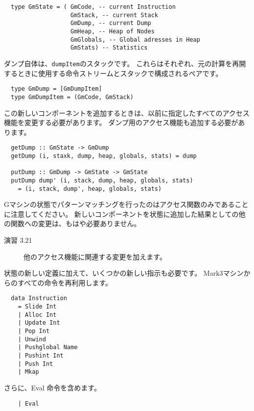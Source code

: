 \documentclass{jarticle}
\begin{document}
\begin{verbatim}
  type GmState = ( GmCode, -- current Instruction
                   GmStack, -- current Stack
                   GmDump, -- current Dump
                   GmHeap, -- Heap of Nodes
                   GmGlobals, -- Global adresses in Heap
                   GmStats) -- Statistics
\end{verbatim}

ダンプ自体は、\texttt{dumpItem}のスタックです。
これらはそれぞれ、元の計算を再開するときに使用する命令ストリームとスタックで構成されるペアです。

\begin{verbatim}
  type GmDump = [GmDumpItem]
  type GmDumpItem = (GmCode, GmStack)
\end{verbatim}

この新しいコンポーネントを追加するときは、以前に指定したすべてのアクセス機能を変更する必要があります。
ダンプ用のアクセス機能も追加する必要があります。

\begin{verbatim}
  getDump :: GmState -> GmDump
  getDump (i, staxk, dump, heap, globals, stats) = dump

  putDump :: GmDump -> GmState -> GmState
  putDump dump' (i, stack, dump, heap, globals, stats)
    = (i, stack, dump', heap, globals, stats)
\end{verbatim}

Gマシンの状態でパターンマッチングを行ったのはアクセス関数のみであることに注意してください。
新しいコンポーネントを状態に追加した結果としての他の関数への変更は、もはや必要ありません。

\begin{description}
	\item[演習 3.21] 他のアクセス機能に関連する変更を加えます。
\end{description}

状態の新しい定義に加えて、いくつかの新しい指示も必要です。
Mark3マシンからのすべての命令を再利用します。

\begin{verbatim}
  data Instruction
    = Slide Int
    | Alloc Int
    | Update Int
    | Pop Int
    | Unwind
    | Pushglobal Name
    | Pushint Int
    | Push Int
    | Mkap
\end{verbatim}

さらに、Eval 命令を含めます。

\begin{verbatim}
    | Eval
\end{verbatim}
\end{document}
